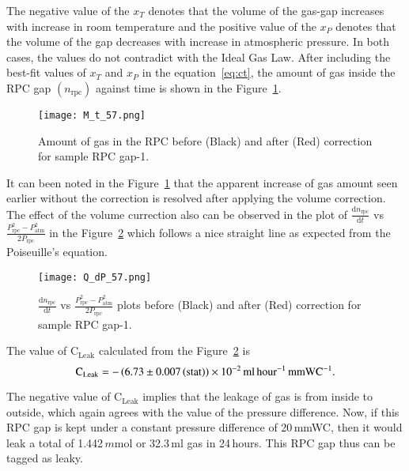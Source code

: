 The negative value of the $x_T$ denotes that the volume of the gas-gap
increases with increase in room temperature and the positive value of the
$x_P$ denotes that the volume of the gap decreases with increase in atmospheric
pressure. In both cases, the values do not contradict with the Ideal Gas Law.
After including the best-fit values of $x_T$ and $x_P$ in the
equation~\ref{eq:ct}, the amount of gas inside the RPC gap
$\left(n_{\textrm{rpc}}\right)$ against time is shown in the Figure~\ref{fig:with}.
\begin{figure}[h]
  \centering
  \texttt{[image: M\_t\_57.png]}
  \caption{Amount of gas in the RPC before (Black) and after (Red) correction
    for sample RPC gap-1.
  }
  \label{fig:with}
\end{figure} 
It can been noted in the Figure~\ref{fig:with} that the apparent increase of
gas amount seen earlier without the correction is resolved after applying the
volume correction. The effect of the volume currection also can be observed in
the plot of $\frac{\mathrm{d}n_{\textrm{rpc}}}{\mathrm{d}t}$ vs
$\frac{P_{\textrm{rpc}}^{2}-P_{\textrm{atm}}^{2}}{2P_{\textrm{rpc}}}$ in the
Figure~\ref{fig:qt} which follows a nice straight line as expected from the
Poiseuille's equation.
\begin{figure}[h]
  \centering
  \texttt{[image: Q\_dP\_57.png]}
  \caption{$\frac{\mathrm{d}n_{\textrm{rpc}}}{\mathrm{d}t}$ vs
    $\frac{P_{\textrm{rpc}}^{2}-P_{\textrm{atm}}^{2}}{2P_{\textrm{rpc}}}$ plots before
    (Black) and after (Red) correction for sample RPC gap-1.}
  \label{fig:qt}
\end{figure}

The value of $\textrm{C}_{\textrm{Leak}}$ calculated from the
Figure~\ref{fig:qt} is
\[\textrm{C}_{\textrm{Leak}}=-\left(6.73\pm 0.007\left(\textrm{stat}\right)\right)\times 10^{-2}\textrm{\,ml\,hour$^{-1}$\,mmWC$^{-1}$}.\]

The negative value of $\textrm{C}_{\textrm{Leak}}$ implies that the leakage of gas
is from inside to outside, which again agrees with the value of the pressure
difference. Now, if this RPC gap is kept under a constant pressure difference
of 20\,mmWC, then it would leak a total of 1.442\,$m$mol or 32.3\,ml gas in
24\,hours. This RPC gap thus can be tagged as leaky.


